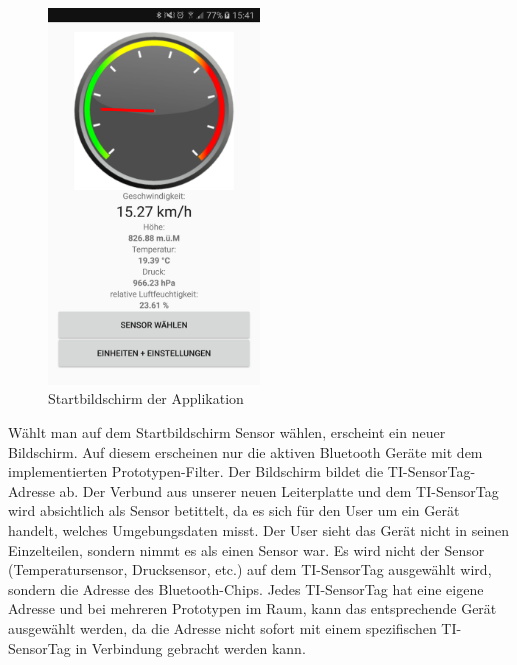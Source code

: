 \begin{figure}[ht]
    \includegraphics[width=0.5\textwidth]{4Resultate/imag/APPHomeScreen.png} 
    \caption{Startbildschirm der Applikation}
    \label{tacho}
\end{figure}

Wählt man auf dem Startbildschirm \glqq Sensor wählen\grqq, erscheint ein neuer Bildschirm. Auf diesem erscheinen nur die aktiven Bluetooth Geräte mit dem implementierten Prototypen-Filter. Der Bildschirm bildet die TI-SensorTag-Adresse ab. Der Verbund aus unserer neuen Leiterplatte und dem TI-SensorTag wird absichtlich als Sensor betittelt, da es sich für den User um ein Gerät handelt, welches Umgebungsdaten misst. Der User sieht das Gerät nicht in seinen Einzelteilen, sondern nimmt es als einen Sensor war. Es wird nicht der Sensor (Temperatursensor, Drucksensor, etc.) auf dem TI-SensorTag ausgewählt wird, sondern die Adresse des Bluetooth-Chips. Jedes TI-SensorTag hat eine eigene Adresse und bei mehreren Prototypen im Raum, kann das entsprechende Gerät ausgewählt werden, da die Adresse nicht sofort mit einem spezifischen TI-SensorTag in Verbindung gebracht werden kann.

